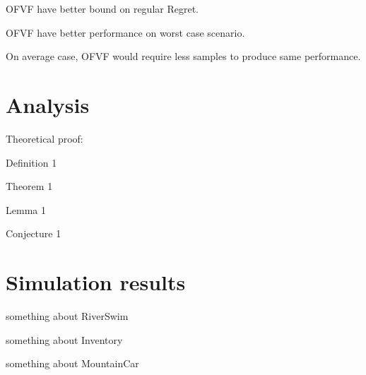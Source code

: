 \documentclass{article}
\begin{document}
OFVF have better bound on regular Regret.

OFVF have better performance on worst case scenario.

On average case, OFVF would require less samples to produce same
performance.


\section{Analysis}

Theoretical proof:

Definition 1

Theorem 1

Lemma 1

Conjecture 1

\section{Simulation results}

something about RiverSwim

something about Inventory

something about MountainCar
\end{document}
